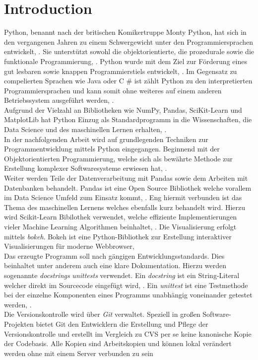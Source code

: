 \chapter{Introduction}

Python, benannt nach der britischen Komikertruppe Monty Python, hat sich in den vergangenen Jahren zu einem Schwergewicht unter den Programmiersprachen entwickelt, \cite{Steyer:2018}.
Sie unterstützt sowohl die objektorientierte, die prozedurale sowie die funktionale Programmierung, \cite{Häberlein:2024}. Python wurde mit dem Ziel zur Förderung eines gut lesbaren sowie knappen Programmierstiels entwickelt, \cite{Steyer:2018}. 
Im Gegensatz zu compelierten Sprachen wie Java oder C \# ist zählt Python zu den interpretierten Programmiersprachen und kann somit ohne weiteres auf einem anderen Betriebssystem ausgeführt werden, \cite{Häberlein:2024}. \\
Aufgrund der Vielzahl an Bibliotheken wie NumPy, Pandas, SciKit-Learn und MatplotLib hat Python Einzug als Standardprogramm in die Wissenschaften, die Data Science und des maschinellen Lernen erhalten, \cite{VanderPlas:2023}. \\
In der nachfolgenden Arbeit wird auf grundlegenden Techniken zur Programmentwicklung mittels Python eingegangen. Beginnend mit der Objektorientierten Programmierung, welche sich als bewährte Methode zur Erstellung komplexer Softwaresysteme erwiesen hat, \cite{Lahres:2021}.\\
Weiter werden Teile der Datenverarbeitung mit Pandas sowie dem Arbeiten mit Datenbanken behandelt. Pandas ist eine Open Source Bibliothek welche vorallem im Data Science Umfeld zum Einsatz kommt, \cite{Nelli:2023}. Eng hiermit verbunden ist das Thema des maschinellen Lernens welches ebenfalls kurz behandelt wird. Hierzu wird Scikit-Learn Bibilothek verwendet, welche effiziente Implementierungen vieler Machine Learning Algorithmen beinhaltet, \cite{Geron:2022}. Die Visualisierung erfolgt mittels \textit{bokeh}. Bokeh ist eine Python-Bibliothek zur Erstellung interaktiver Visualisierungen für moderne Webbrowser, \cite{Boekeh}\\ 
Das erzeugte Programm soll nach gängigen Entwicklungsstandards. Dies beinhaltet unter anderem auch eine klare Dokumentation. Hierzu werden sogenannte \textit{docstrings}  \textit{unittests} verwendet. Ein \textit{docstring} ist ein String-Literal welcher direkt im Sourcecode eingefügt wird, \cite{Pajankar:2022}. Ein \textit{unittest} ist eine Testmethode bei der einzelne Komponenten eines Programms unabhängig voneinander getestet werden, \cite{Pajankar:2022}. \\
Die Versionskontrolle wird über \textit{Git} verwaltet. Speziell in großen Software-Projekten bietet Git den Entwicklern die Erstellung und Pflege der Versionskontrolle und erstellt im Vergleich zu CVS per se keine kanonische Kopie der Codebasis. Alle Kopien sind Arbeitskopien und können lokal verändert werden ohne mit einem Server verbunden zu sein \cite{Russell:2019}
